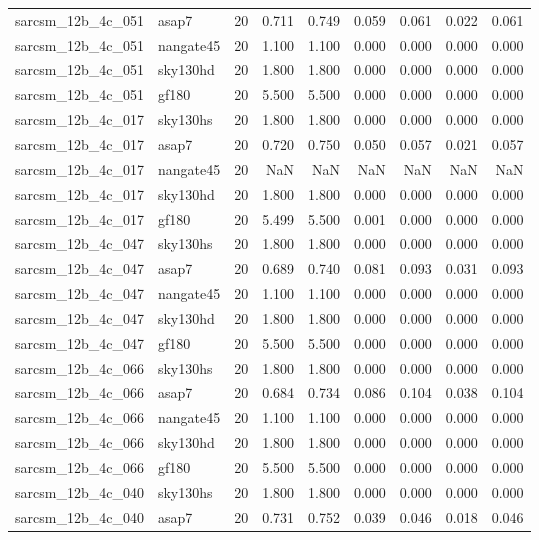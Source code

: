 \begin{tabular}{llrrrrrrr}
sarcsm\_12b\_4c\_051 & asap7 & 20 & 0.711 & 0.749 & 0.059 & 0.061 & 0.022 & 0.061 \\
sarcsm\_12b\_4c\_051 & nangate45 & 20 & 1.100 & 1.100 & 0.000 & 0.000 & 0.000 & 0.000 \\
sarcsm\_12b\_4c\_051 & sky130hd & 20 & 1.800 & 1.800 & 0.000 & 0.000 & 0.000 & 0.000 \\
sarcsm\_12b\_4c\_051 & gf180 & 20 & 5.500 & 5.500 & 0.000 & 0.000 & 0.000 & 0.000 \\
sarcsm\_12b\_4c\_017 & sky130hs & 20 & 1.800 & 1.800 & 0.000 & 0.000 & 0.000 & 0.000 \\
sarcsm\_12b\_4c\_017 & asap7 & 20 & 0.720 & 0.750 & 0.050 & 0.057 & 0.021 & 0.057 \\
sarcsm\_12b\_4c\_017 & nangate45 & 20 & NaN & NaN & NaN & NaN & NaN & NaN \\
sarcsm\_12b\_4c\_017 & sky130hd & 20 & 1.800 & 1.800 & 0.000 & 0.000 & 0.000 & 0.000 \\
sarcsm\_12b\_4c\_017 & gf180 & 20 & 5.499 & 5.500 & 0.001 & 0.000 & 0.000 & 0.000 \\
sarcsm\_12b\_4c\_047 & sky130hs & 20 & 1.800 & 1.800 & 0.000 & 0.000 & 0.000 & 0.000 \\
sarcsm\_12b\_4c\_047 & asap7 & 20 & 0.689 & 0.740 & 0.081 & 0.093 & 0.031 & 0.093 \\
sarcsm\_12b\_4c\_047 & nangate45 & 20 & 1.100 & 1.100 & 0.000 & 0.000 & 0.000 & 0.000 \\
sarcsm\_12b\_4c\_047 & sky130hd & 20 & 1.800 & 1.800 & 0.000 & 0.000 & 0.000 & 0.000 \\
sarcsm\_12b\_4c\_047 & gf180 & 20 & 5.500 & 5.500 & 0.000 & 0.000 & 0.000 & 0.000 \\
sarcsm\_12b\_4c\_066 & sky130hs & 20 & 1.800 & 1.800 & 0.000 & 0.000 & 0.000 & 0.000 \\
sarcsm\_12b\_4c\_066 & asap7 & 20 & 0.684 & 0.734 & 0.086 & 0.104 & 0.038 & 0.104 \\
sarcsm\_12b\_4c\_066 & nangate45 & 20 & 1.100 & 1.100 & 0.000 & 0.000 & 0.000 & 0.000 \\
sarcsm\_12b\_4c\_066 & sky130hd & 20 & 1.800 & 1.800 & 0.000 & 0.000 & 0.000 & 0.000 \\
sarcsm\_12b\_4c\_066 & gf180 & 20 & 5.500 & 5.500 & 0.000 & 0.000 & 0.000 & 0.000 \\
sarcsm\_12b\_4c\_040 & sky130hs & 20 & 1.800 & 1.800 & 0.000 & 0.000 & 0.000 & 0.000 \\
sarcsm\_12b\_4c\_040 & asap7 & 20 & 0.731 & 0.752 & 0.039 & 0.046 & 0.018 & 0.046 \\

\end{tabular}
